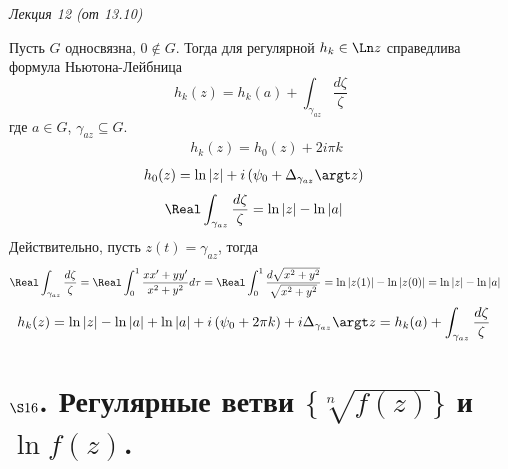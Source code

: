 \begin{flushright}
    \textit{Лекция 12 (от 13.10)}
\end{flushright}
\corollary
Пусть $G$ односвязна, $0 \not \in G$. Тогда для регулярной $h_k \in \Ln z$
справедлива формула Ньютона-Лейбница
\begin{equation}\label{(15.13)}
    h_k(z) = h_k(a) + \int_{\gamma_{az}}\frac{d\zeta}{\zeta}
\end{equation}
где $a \in G$, $\gamma_{az} \subseteq G$.
\pr
\begin{align*}
  & h_k(z) = h_0(z) + 2i \pi k
\end{align*}
\begin{align*}
  & h_0(z) = \ln \left| z \right| + i \left( \psi_0 + \Delta_{\gamma_{az}}\argt z \right)
\end{align*}
\begin{align*}
  & \Real \int_{\gamma_{az}} \frac{d\zeta}{\zeta} = \ln \left| z \right| - \ln \left| a \right|
\end{align*}
Действительно, пусть $z(t) = \gamma_{az}$, тогда
\begin{align*}
  & \Real \int_{\gamma_{az}} \frac{d\zeta}{\zeta} = \Real \int_0^1 \frac{xx'+yy'}{x^2+y^2} d \tau = \Real \int_0^1 \frac{d \sqrt{x^2+y^2}}{\sqrt{x^2+y^2}} = \ln \left| z(1) \right| - \ln \left| z(0) \right| = \ln \left| z \right| - \ln \left| a \right|
\end{align*}
\begin{align*}
  & h_k(z) = \ln \left| z \right| - \ln \left| a \right| + \ln\left| a \right| + i \left( \psi_0 + 2 \pi k \right) + i \Delta_{\gamma_{az}}\argt z = h_k(a) + \int_{\gamma_{az}}\frac{d\zeta}{\zeta}
\end{align*}
\section{$\S 16$. Регулярные ветви $\{\sqrt[n]{f(z)}\}$ и $\ln f(z)$.}